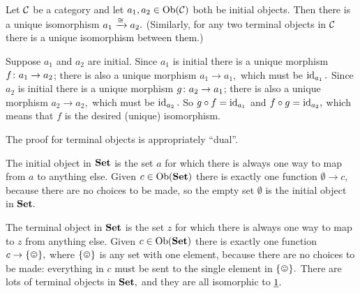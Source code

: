\documentclass[../main/CT4S-EN-RU]{subfiles}
\begin{document}
\begin{warningRUS}
\end{warningRUS}

\begin{propositionENG}\label{prop:initials are isomorphic}
Let $\mathcal{C}$ be a category and let $a_1,a_2\in\operatorname{Ob}(\mathcal{C})$ both be initial objects. Then there is a unique isomorphism $a_1\xrightarrow{\cong}a_2.$ (Similarly, for any two terminal objects in $\mathcal{C}$ there is a unique isomorphism between them.) 
\end{propositionENG}

\begin{propositionRUS}\label{prop:initials are isomorphic}
\end{propositionRUS}

\begin{proofENG}
Suppose $a_1$ and $a_2$ are initial. Since $a_1$ is initial there is a unique morphism $f\colon a_1\rightarrow a_2$; there is also a unique morphism $a_1\to a_1,$ which must be $\operatorname{id}_{a_1}.$ Since $a_2$ is initial there is a unique morphism $g\colon a_2\rightarrow a_1$; there is also a unique morphism $a_2\to a_2,$ which must be $\operatorname{id}_{a_2}.$ So $g\circ f=\operatorname{id}_{a_1}$ and $f\circ g=\operatorname{id}_{a_2},$ which means that $f$ is the desired (unique) isomorphism.

The proof for terminal objects is appropriately “dual”.
\end{proofENG}

\begin{proofRUS}
\end{proofRUS}

\begin{exampleENG}\label{ex:universal obs in set}
The initial object in ${\mathbf{Set}}$ is the set $a$ for which there is always one way to map from $a$ to anything else. Given $c\in\operatorname{Ob}({\mathbf{Set}})$ there is exactly one function $\emptyset\to c,$ because there are no choices to be made, so the empty set $\emptyset$ is the initial object in ${\mathbf{Set}}.$

The terminal object in ${\mathbf{Set}}$ is the set $z$ for which there is always one way to map to $z$ from anything else. Given $c\in\operatorname{Ob}({\mathbf{Set}})$ there is exactly one function $c\to\singleton,$ where $\singleton$ is any set with one element, because there are no choices to be made: everything in $c$ must be sent to the single element in $\singleton.$ There are lots of terminal objects in ${\mathbf{Set}},$ and they are all isomorphic to $\underline{1}.$
\end{exampleENG}
\end{document}
